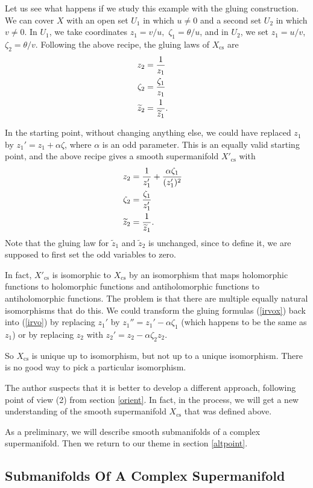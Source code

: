 \documentclass[11pt,a4paper]{article}
\def\t{{ \sf t}}
\def\cs{{\mathrm{cs}}}
\def\tilde{\widetilde}
\def\t{\tilde }
\def\tilde{\widetilde}
\begin{document}
Let us see what happens if we study this example with the gluing construction.  We can cover $X$ with an open set $U_1$ in which $u\not=0$ and a second set $U_2$ in which $v\not=0$.
In $U_1$, we take coordinates $z_1=v/u,$ $\zeta_1=\theta/u$, and in $U_2$, we set $z_1=u/v$, $\zeta_2=\theta/v$.
Following the above recipe, the gluing laws of $X_\cs$ are
\begin{align}\label{irvo} z_2&= \frac{1}{z_1}\cr \zeta_2&=\frac{\zeta_1}{z_1} \cr\t z_2& =\frac{1}{\t z_1}.\end{align}

In the starting point, without changing anything else, we could have replaced $z_1$ by $z_1'=z_1+\alpha\zeta$, where $\alpha$ is an odd parameter.
This is an equally valid starting point, and  the above recipe gives a smooth supermanifold $X'_\cs$ with
\begin{align}\label{irvox} z_2& =\frac{1}{z_1'}+\frac{\alpha\zeta_1}{(z_1')^2}\cr \zeta_2&=\frac{\zeta_1}{z_1'} \cr\t z_2& =\frac{1}{\t z_1}.\end{align}  Note that the gluing
law for $\t z_1$ and $\t z_2$ is unchanged, since to define it, we are supposed to first set the odd variables to zero.

In fact, $X'_\cs$ is isomorphic to $X_\cs$ by an isomorphism that maps  holomorphic functions to holomorphic functions and antiholomorphic functions to antiholomorphic functions.
The problem is that there are multiple equally natural isomorphisms that do this.  We could transform the gluing formulas (\ref{irvox}) back into (\ref{irvo})
by replacing $z_1'$ by $z_1''=z_1'-\alpha\zeta_1$ (which happens to be the same as $z_1$) or by replacing $z_2$ with $z_2'=z_2-\alpha\zeta_2z_2$.  

So $X_\cs$ is unique up to isomorphism, but not up to a unique isomorphism.    There is no good way to pick a particular isomorphism.


The author suspects that it is better to develop a different approach, following point of view (2) from section \ref{orient}.  In fact, in the process, we will get a new
understanding of the smooth supermanifold  $X_\cs$ that was defined above.

As a preliminary, we will describe smooth submanifolds of a complex supermanifold.  Then we return to our theme in section \ref{altpoint}.

\subsection{Submanifolds Of A Complex Supermanifold}\label{zmon}
\end{document}

